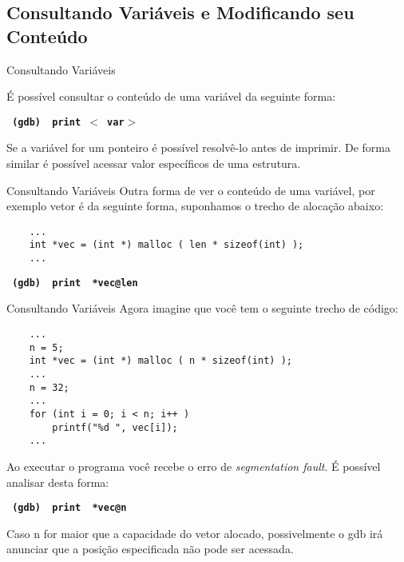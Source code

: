 \subsection{ Consultando Variáveis e Modificando seu Conteúdo }
\frame{\tableofcontents[
    currentsection,
    currentsubsection,
    subsectionstyle=show/shaded/hide
]}
\begin{frame}[fragile]{Consultando Variáveis}

    É possível consultar o conteúdo de uma variável da seguinte forma:
    
    \begin{center}
        \small
        \texttt{ \textbf{ (gdb) {\color{blue} print} $<${\color{red} var}$>$ }}
    \end{center}
    Se a variável for um ponteiro é possível resolvê-lo antes de imprimir. De forma similar é possível acessar valor específicos de uma estrutura.

\end{frame}

\begin{frame}[fragile]{Consultando Variáveis}
    Outra forma de ver o conteúdo de uma variável, por exemplo vetor é da seguinte forma, suponhamos o trecho de alocação abaixo:
    
    \begin{lstlisting}
    ...
    int *vec = (int *) malloc ( len * sizeof(int) );
    ...
    \end{lstlisting}
    
    \begin{center}
        \small
        \texttt{ \textbf{ (gdb) {\color{blue} print} {\color{red} *vec@len} }}
    \end{center}
\end{frame}

\begin{frame}[fragile]{Consultando Variáveis}
    Agora imagine que você tem o seguinte trecho de código:
    \begin{lstlisting}
    ...
    n = 5;
    int *vec = (int *) malloc ( n * sizeof(int) );
    ...
    n = 32;
    ...
    for (int i = 0; i < n; i++ )
        printf("%d ", vec[i]);
    ...
    \end{lstlisting}
    
    Ao executar o programa você recebe o erro de \textit{segmentation fault}. É possível analisar desta forma: 
    \begin{center}
        \small
        \texttt{ \textbf{ (gdb) {\color{blue} print} {\color{red} *vec@n} }}
    \end{center}
    Caso n for maior que a capacidade do vetor alocado, possivelmente o gdb irá anunciar que a posição especificada não pode ser acessada.
\end{frame}

